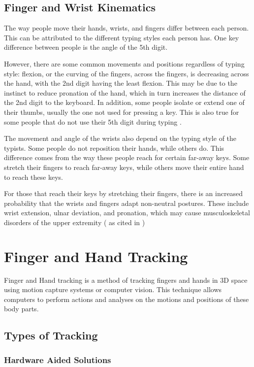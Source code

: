 \documentclass{report}
\begin{document}
\subsection{Finger and Wrist Kinematics}
The way people move their hands, wrists, and fingers differ between each person.
This can be attributed to the different typing styles each person has. One key
difference between people is the angle of the 5th digit.

However, there are some common movements and positions regardless of typing
style: flexion, or the curving of the fingers, across the fingers, is decreasing
across the hand, with the 2nd digit having the least flexion. This may be due to
the instinct to reduce pronation of the hand, which in turn increases the
distance of the 2nd digit to the keyboard. In addition, some people isolate or
extend one of their thumbs, usually the one not used for pressing a key. This is
also true for some people that do not use their 5th digit during typing
\parencite{baker2007}.

The movement and angle of the wrists also depend on the typing style of the
typists. Some people do not reposition their hands, while others do. This
difference comes from the way these people reach for certain far-away keys. Some
stretch their fingers to reach far-away keys, while others move their entire
hand to reach these keys.

For those that reach their keys by stretching their fingers, there is an
increased probability that the wrists and fingers adapt non-neutral postures.
These include wrist extension, ulnar deviation, and pronation, which may cause
musculoskeletal disorders of the upper extremity (\cite{marklin1999} as cited in
\cite{baker2007})

\section{Finger and Hand Tracking}
Finger and Hand tracking is a method of tracking fingers and hands in 3D space
using motion capture systems or computer vision. This technique allows computers
to perform actions and analyses on the motions and positions of these body
parts.


\subsection{Types of Tracking}

\subsubsection{Hardware Aided Solutions}
\end{document}

